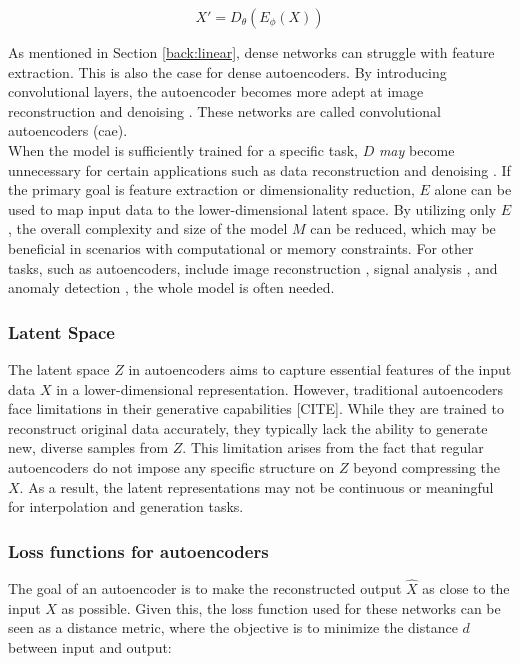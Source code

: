 \begin{equation}
    X' = D_\theta(E_\phi(X))
\end{equation}

As mentioned in Section \ref{back:linear}, dense networks can struggle with feature extraction. This is also the case for dense autoencoders. By introducing convolutional layers, the autoencoder becomes more adept at image reconstruction and denoising \cite{zhang2018better}. These networks are called convolutional autoencoders (\acrshort{cae}).  \\

When the model is sufficiently trained for a specific task, $D$ \textit{may} become unnecessary for certain applications such as data reconstruction and denoising \cite{vincent2010stacked}. If the primary goal is feature extraction or dimensionality reduction, $E$ alone can be used to map input data to the lower-dimensional latent space. By utilizing only $E$, the overall complexity and size of the model $M$ can be reduced, which may be beneficial in scenarios with computational or memory constraints. For other tasks, such as autoencoders, include image reconstruction \cite{7797236}, signal analysis \cite{andrysiak2016machine}, and anomaly detection \cite{bank2021autoencoders}, the whole model is often needed.
\subsubsection{Latent Space}

The latent space $Z$ in autoencoders aims to capture essential features of the input data $X$ in a lower-dimensional representation. However, traditional autoencoders face limitations in their generative capabilities [CITE]. While they are trained to reconstruct original data accurately, they typically lack the ability to generate new, diverse samples from $Z$.
This limitation arises from the fact that regular autoencoders do not impose any specific structure on $Z$ beyond compressing the $X$. As a result, the latent representations may not be continuous or meaningful for interpolation and generation tasks.



\subsubsection{Loss functions for autoencoders}

The goal of an autoencoder is to make the reconstructed output $\hat{X}$ as close to the input $X$ as possible. Given this, the loss function used for these networks can be seen as a distance metric, where the objective is to minimize the distance $d$ between input and output:

